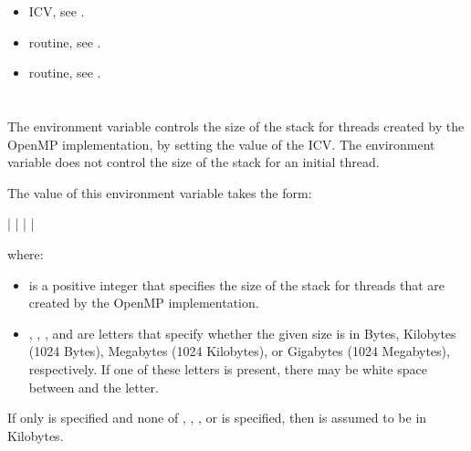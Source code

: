 \crossreferences
\begin{itemize}
\item {} ICV, see .

\item {} routine, see .

\item {} routine, see .
\end{itemize}











\section{}
\label{sec:OMP_STACKSIZE}
The  environment variable controls the size of the stack for threads 
created by the OpenMP implementation, by setting the value of the  ICV. 
The environment variable does not control the size of the stack for an initial thread. 

The value of this environment variable takes the form: 

 |  |  |  | 

where: 

\begin{itemize}
\item {} is a positive integer that specifies the size of the stack for threads that are created 
by the OpenMP implementation. 

\item {}, , , and  are letters that specify 
whether the given size is in Bytes, Kilobytes 
(1024 Bytes), Megabytes (1024 Kilobytes), or Gigabytes (1024 Megabytes), 
respectively. If one of these letters is present, there may be white space between 
 and the letter.
\end{itemize}

If only  is specified and none of , , , or  
is specified, then  is assumed to be in Kilobytes.

